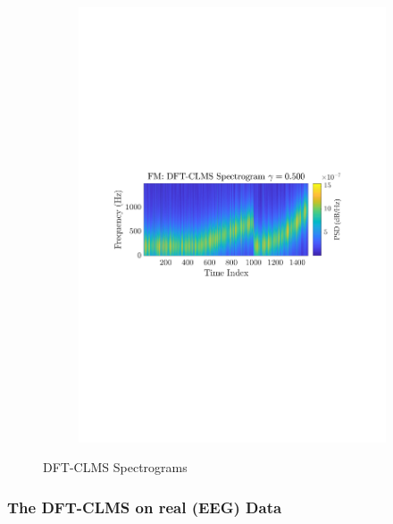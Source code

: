 \documentclass[12pt]{article}
\begin{document}
\begin{figure}[H]
\begin{subfigure}{0.49\textwidth}
					\includegraphics[trim={2.2cm 11.2cm 3.00cm  11.2cm}, clip, width=\textwidth]{../MATLAB/figures/q3_3c_fig05.pdf} 
					\captionsetup{justification=centering}
				\end{subfigure}
				
				\captionsetup{justification=centering}
				\caption{DFT-CLMS Spectrograms}
				\label{fig: 3-3c}
			\end{figure}
			
			
		\subsubsection{The DFT-CLMS on real (EEG) Data}
			
\end{document}
